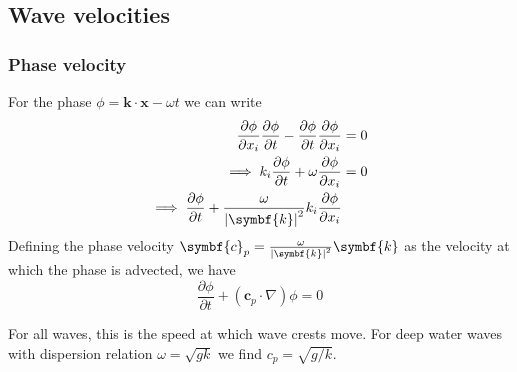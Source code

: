 \documentclass{jknotes}
\begin{document}
\subsection{Wave velocities}
\subsubsection{Phase velocity}
For the phase $\phi =
\symbf{k}\cdot\symbf{x} - \omega t$ we can write
\begin{align}
	\frac{\partial \phi}{\partial x_i} \frac{\partial \phi}{\partial t} -
	\frac{\partial \phi}{\partial t} \frac{\partial \phi}{\partial x_i} &= 0
	\\
	\implies k_i \frac{\partial \phi}{\partial t} + \omega \frac{\partial
\phi}{\partial x_i} &= 0\\
\implies \frac{\partial \phi}{\partial t} + \frac{\omega}{\abs{\symbf{k}}^2}
k_i \frac{\partial \phi}{\partial x_i}
\end{align}
Defining the phase velocity $\symbf{c}_p = \frac{\omega}{\abs{\symbf{k}}^2}
\symbf{k}$ as the velocity at which the phase is advected, we have
\begin{equation}
	\frac{\partial \phi}{\partial t} + (\symbf{c}_p \cdot \nabla) \phi = 0
\end{equation}

For all waves, this is the speed at which wave crests move. For deep water
waves with dispersion relation $\omega = \sqrt{gk}$ we find $c_p =
\sqrt{g/k}$. 
\end{document}
